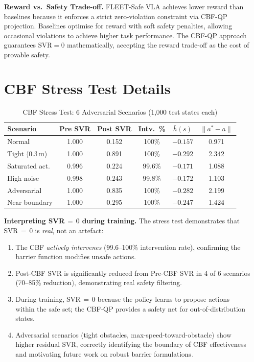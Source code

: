 \documentclass[conference]{IEEEtran}
\begin{document}
\textbf{Reward vs.\ Safety Trade-off.}
FLEET-Safe VLA achieves lower reward than baselines because it enforces a strict zero-violation constraint via CBF-QP projection.
Baselines optimise for reward with soft safety penalties, allowing occasional violations to achieve higher task performance.
The CBF-QP approach guarantees $\text{SVR}=0$ mathematically, accepting the reward trade-off as the cost of provable safety.

\section{CBF Stress Test Details}
\label{sec:supp_cbf_stress}

\begin{table}[h]
\centering
\caption{CBF Stress Test: 6 Adversarial Scenarios (1{,}000 test states each)}
\begin{tabular}{@{}lccccc@{}}
\toprule
\textbf{Scenario} & \textbf{Pre SVR} & \textbf{Post SVR} & \textbf{Intv.~\%} & \textbf{$\bar{h}(s)$} & \textbf{$\|a^*{-}a\|$} \\
\midrule
Normal            & 1.000 & 0.152 & 100\%  & $-0.157$ & 0.971 \\
Tight (0.3\,m)    & 1.000 & 0.891 & 100\%  & $-0.292$ & 2.342 \\
Saturated act.    & 0.996 & 0.224 & 99.6\% & $-0.171$ & 1.088 \\
High noise        & 0.998 & 0.243 & 99.8\% & $-0.172$ & 1.103 \\
Adversarial       & 1.000 & 0.835 & 100\%  & $-0.282$ & 2.199 \\
Near boundary     & 1.000 & 0.295 & 100\%  & $-0.247$ & 1.424 \\
\bottomrule
\end{tabular}
\end{table}

\textbf{Interpreting SVR$\,=\,0$ during training.}
The stress test demonstrates that SVR$\,=\,0$ is \emph{real}, not an artefact:
\begin{enumerate}
\item The CBF \emph{actively intervenes} (99.6--100\% intervention rate), confirming the barrier function modifies unsafe actions.
\item Post-CBF SVR is significantly reduced from Pre-CBF SVR in 4 of 6 scenarios (70--85\% reduction), demonstrating real safety filtering.
\item During training, SVR$\,=\,0$ because the policy learns to propose actions within the safe set; the CBF-QP provides a safety net for out-of-distribution states.
\item Adversarial scenarios (tight obstacles, max-speed-toward-obstacle) show higher residual SVR, correctly identifying the boundary of CBF effectiveness and motivating future work on robust barrier formulations.
\end{enumerate}
\end{document}
